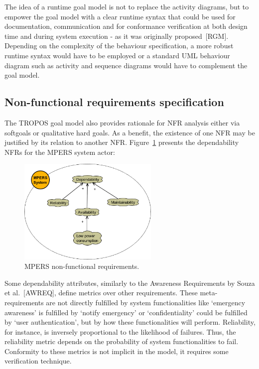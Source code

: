 The idea of a runtime goal model is not to replace the activity diagrams, but to empower the goal model with a clear runtime syntax that could be used for 
documentation, communication and for conformance verification at both design time and during system execution - as it was originally proposed~[RGM]. Depending on the complexity of the behaviour specification, a more robust runtime syntax would have to be employed or a standard UML behaviour diagram such as activity and sequence diagrams would have to complement the goal model.

\subsection{Non-functional requirements specification}

The TROPOS goal model also provides rationale for NFR analysis either via softgoals or qualitative hard goals. As a benefit, the existence of one NFR may be justified by its relation to another NFR. Figure~\ref{fig:MPERS_NFR} presents the dependability NFRs for the MPERS system actor:

\begin{figure}[h!]
\centering
\includegraphics[width=0.6\textwidth]{imgs/MPERS_NFR.png}
\caption{MPERS non-functional requirements.}
\label{fig:MPERS_NFR}
\end{figure}

Some dependability attributes, similarly to the Awareness Requirements by Souza et al.~[AWREQ], define metrics over other requirements. These meta-requirements are not directly fulfilled by system functionalities like `emergency awareness' is fulfilled by `notify emergency' or `confidentiality' could be fulfilled by `user authentication', but by how these functionalities will perform. Reliability, for instance, is inversely proportional to the likelihood of failures. Thus, the reliability metric depends on the probability of system functionalities to fail. Conformity to these metrics is not implicit in the model, it requires some verification technique.

